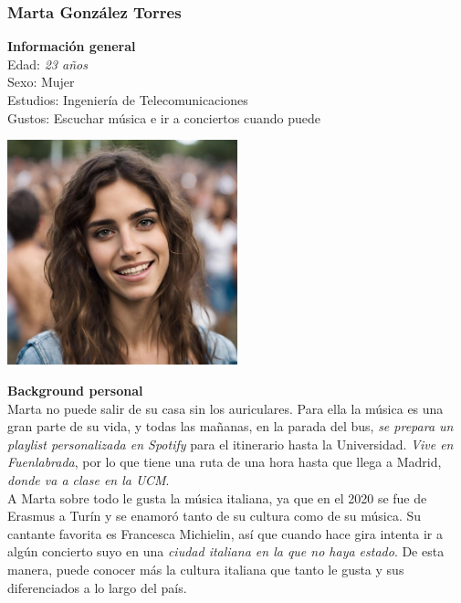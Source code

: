 \subsubsection{Marta González Torres}

\begin{minipage}{0.4\textwidth}
    \textbf{Información general} \\

    Edad: \textit{23 años} \\
    Sexo: Mujer \\
    Estudios: Ingeniería de Telecomunicaciones \\
    Gustos: Escuchar música e ir a conciertos cuando puede \\
\end{minipage}
\hfill
\begin{minipage}{0.4\textwidth}
    \centering
    \includegraphics[width=0.5\textwidth]{Imagenes/Personas/Marta.jpg}
    \label{fig:fotoMarta}
\end{minipage}

\textbf{Background personal} \\

Marta no puede salir de su casa sin los auriculares. Para ella la música es una gran parte
de su vida, y todas las mañanas, en la parada del bus, \textit{se prepara un playlist personalizada
en Spotify} para el itinerario hasta la Universidad. \textit{Vive en Fuenlabrada}, por lo que tiene
una ruta de una hora hasta que llega a Madrid, \textit{donde va a clase en la UCM}. \\ 

A Marta sobre todo le gusta la música italiana, ya que en el 2020 se fue de Erasmus a Turín y se
enamoró tanto de su cultura como de su música. Su cantante favorita es Francesca Michielin, así que
cuando hace gira intenta ir a algún concierto suyo en una \textit{ciudad italiana en la que no haya
estado}. De esta manera, puede conocer más la cultura italiana que tanto le gusta y sus diferenciados
a lo largo del país. \\

